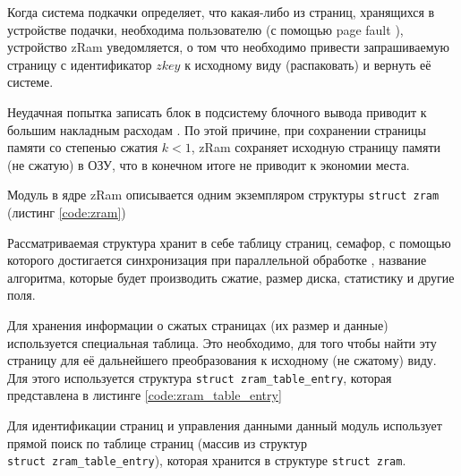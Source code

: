 Когда система подкачки определяет, что какая-либо из страниц, хранящихся в устройстве подачки, необходима пользователю (с помощью page fault \cite{page-fault}), устройство zRam уведомляется, о том что необходимо привести запрашиваемую страницу с идентификатор $zkey$ к исходному виду (распаковать) и вернуть её системе.

Неудачная попытка записать блок в подсистему блочного вывода приводит к большим накладным расходам \cite{in-kernel-memory-compression}. По этой причине, при сохранении страницы памяти со степенью сжатия $k < 1$, zRam сохраняет исходную страницу памяти (не сжатую) в ОЗУ, что в конечном итоге не приводит к экономии места.

Модуль в ядре zRam описывается одним экземпляром структуры \texttt{struct zram} (листинг \ref{code:zram})


Рассматриваемая структура хранит в себе таблицу страниц, семафор, с помощью которого достигается синхронизация при параллельной обработке \cite{in-kernel-memory-compression}, название алгоритма, которые будет производить сжатие, размер диска, статистику и другие поля.

Для хранения информации о сжатых страницах (их размер и данные) используется специальная таблица. Это необходимо, для того чтобы найти эту страницу для её дальнейшего преобразования к исходному (не сжатому) виду. Для этого используется структура \texttt{struct zram\_table\_entry}, которая представлена в листинге \ref{code:zram_table_entry}


Для идентификации страниц и управления данными данный модуль использует прямой поиск по таблице страниц (массив из структур \\\texttt{struct zram\_table\_entry}), которая хранится в структуре \texttt{struct zram}.

